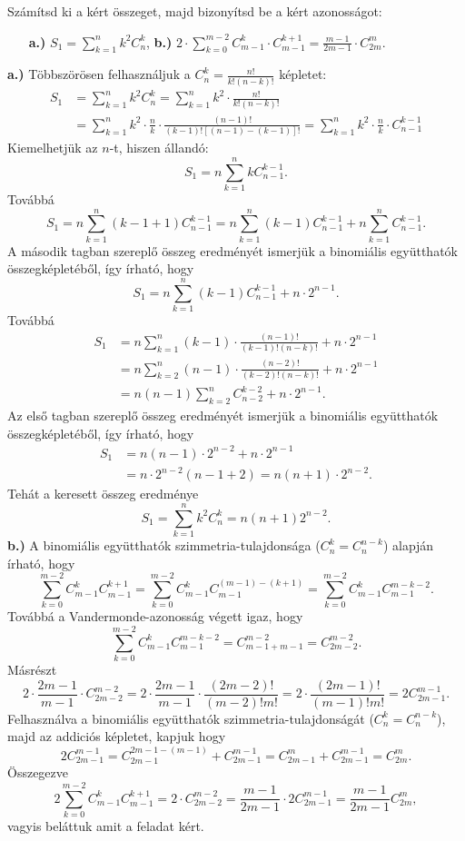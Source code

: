 \begin{problem}
Számítsd ki a kért összeget, majd bizonyítsd be a kért azonosságot: 
\begin{itemize}
\item[{\small\textbf{a.)}}] ${\displaystyle S_{1}=\sum_{k=1}^{n}k^{2}C_{n}^{k}}$, \quad{}\quad{}\textbf{b.)}
${\displaystyle 2\cdot\sum_{k=0}^{m-2}C_{m-1}^{k}\cdot C_{m-1}^{k+1}=\frac{m-1}{2m-1}\cdot C_{2m}^{m}.}$
\end{itemize}
\end{problem}

\begin{solution}
\textbf{a.)} Többszörösen felhasználjuk a ${\displaystyle C_{n}^{k}=\frac{n!}{k!(n-k)!}}$
képletet: 
\begin{align*}
S_{1} & =\sum_{k=1}^{n}k^{2}C_{n}^{k}=\sum_{k=1}^{n}k^{2}\cdot\frac{n!}{k!(n-k)!}\\
 & =\sum_{k=1}^{n}k^{2}\cdot\frac{n}{k}\cdot\frac{(n-1)!}{(k-1)![(n-1)-(k-1)]!}=\sum_{k=1}^{n}k^{2}\cdot\frac{n}{k}\cdot C_{n-1}^{k-1}
\end{align*}
Kiemelhetjük az $n$-t, hiszen állandó: 
\[
S_{1}=n\sum_{k=1}^{n}kC_{n-1}^{k-1}.
\]
Továbbá 
\[
S_{1}=n\sum_{k=1}^{n}(k-1+1)C_{n-1}^{k-1}=n\sum_{k=1}^{n}(k-1)C_{n-1}^{k-1}+n\sum_{k=1}^{n}C_{n-1}^{k-1}.
\]
A második tagban szereplő összeg eredményét ismerjük a binomiális
együtthatók összegképletéből, így írható, hogy 
\[
S_{1}=n\sum_{k=1}^{n}(k-1)C_{n-1}^{k-1}+n\cdot2^{n-1}.
\]
Továbbá 
\begin{align*}
S_{1} & =n\sum_{k=1}^{n}(k-1)\cdot\frac{(n-1)!}{(k-1)!(n-k)!}+n\cdot2^{n-1}\\
 & =n\sum_{k=2}^{n}(n-1)\cdot\frac{(n-2)!}{(k-2)!(n-k)!}+n\cdot2^{n-1}\\
 & =n(n-1)\sum_{k=2}^{n}C_{n-2}^{k-2}+n\cdot2^{n-1}.
\end{align*}
Az első tagban szereplő összeg eredményét ismerjük a binomiális együtthatók
összegképletéből, így írható, hogy 
\begin{align*}
S_{1} & =n(n-1)\cdot2^{n-2}+n\cdot2^{n-1}\\
 & =n\cdot2^{n-2}(n-1+2)=n(n+1)\cdot2^{n-2}.
\end{align*}
Tehát a keresett összeg eredménye 
\[
S_{1}=\sum_{k=1}^{n}k^{2}C_{n}^{k}=n(n+1)2^{n-2}.
\]
\textbf{b.)} A binomiális együtthatók szimmetria-tulajdonsága (${\displaystyle C_{n}^{k}=C_{n}^{n-k}}$)
alapján írható, hogy 
\[
\sum_{k=0}^{m-2}C_{m-1}^{k}C_{m-1}^{k+1}=\sum_{k=0}^{m-2}C_{m-1}^{k}C_{m-1}^{(m-1)-(k+1)}=\sum_{k=0}^{m-2}C_{m-1}^{k}C_{m-1}^{m-k-2}.
\]
Továbbá a Vandermonde-azonosság végett igaz, hogy 
\[
\sum_{k=0}^{m-2}C_{m-1}^{k}C_{m-1}^{m-k-2}=C_{m-1+m-1}^{m-2}=C_{2m-2}^{m-2}.
\]
Másrészt 
\[
2\cdot\frac{2m-1}{m-1}\cdot C_{2m-2}^{m-2}=2\cdot\frac{2m-1}{m-1}\cdot\frac{(2m-2)!}{(m-2)!m!}=2\cdot\frac{(2m-1)!}{(m-1)!m!}=2C_{2m-1}^{m-1}.
\]
Felhasználva a binomiális együtthatók szimmetria-tulajdonságát (${\displaystyle C_{n}^{k}=C_{n}^{n-k}}$),
majd az addiciós képletet, kapjuk hogy 
\[
2C_{2m-1}^{m-1}=C_{2m-1}^{2m-1-(m-1)}+C_{2m-1}^{m-1}=C_{2m-1}^{m}+C_{2m-1}^{m-1}=C_{2m}^{m}.
\]
Összegezve 
\[
2\sum_{k=0}^{m-2}C_{m-1}^{k}C_{m-1}^{k+1}=2\cdot C_{2m-2}^{m-2}=\frac{m-1}{2m-1}\cdot2C_{2m-1}^{m-1}=\frac{m-1}{2m-1}C_{2m}^{m},
\]
vagyis beláttuk amit a feladat kért. 
\end{solution}
